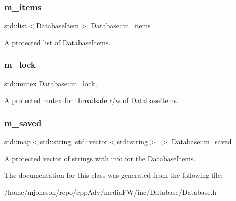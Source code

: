 \mbox{\label{classDatabase_a5a4ac1f3bf0f5fd77a696174ad9e5c45}} 
\subsubsection{\texorpdfstring{m\+\_\+items}{m\_items}}
{\footnotesize\ttfamily std\+::list$<$\hyperlink{classDatabaseItem}{Database\+Item}$>$ Database\+::m\+\_\+items\hspace{0.3cm}{\ttfamily [protected]}}



A protected list of Database\+Items. 

\mbox{\label{classDatabase_a7f55f3a5d93c9694ee4f08a2f2135b1d}} 
\subsubsection{\texorpdfstring{m\+\_\+lock}{m\_lock}}
{\footnotesize\ttfamily std\+::mutex Database\+::m\+\_\+lock\hspace{0.3cm}{\ttfamily [mutable]}, {\ttfamily [protected]}}



A protected mutex for threadsafe r/w of Database\+Items. 

\mbox{\label{classDatabase_a9f87cbe5a1be71d541083dffa8d8c9ad}} 
\subsubsection{\texorpdfstring{m\+\_\+saved}{m\_saved}}
{\footnotesize\ttfamily std\+::map$<$std\+::string, std\+::vector$<$std\+::string$>$ $>$ Database\+::m\+\_\+saved\hspace{0.3cm}{\ttfamily [protected]}}



A protected vector of strings with info for the Database\+Items. 



The documentation for this class was generated from the following file\+:\begin{DoxyCompactItemize}
\item 
/home/mjonsson/repo/cpp\+Adv/media\+F\+W/inc/\+Database/Database.\+h\end{DoxyCompactItemize}
